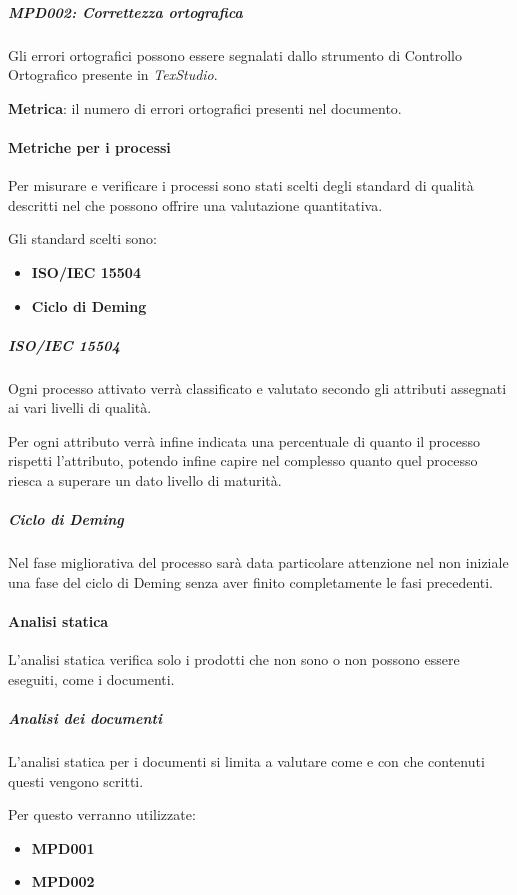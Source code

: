 				\subparagraph{MPD002: Correttezza ortografica}
				Gli errori ortografici possono essere segnalati dallo strumento di Controllo Ortografico presente in \textit{TexStudio}.
				
				\textbf{Metrica}: il numero di errori ortografici presenti nel documento.
	
			\paragraph{Metriche per i processi}
				Per misurare e verificare i processi sono stati scelti degli standard di qualità descritti nel \Doc{\PdQ} che possono offrire una valutazione quantitativa.
				
				Gli standard scelti sono:
				
				\begin{itemize}
					\item \textbf{ISO/IEC 15504}
					\item \textbf{Ciclo di Deming}
				\end{itemize}
			
				\subparagraph*{ISO/IEC 15504}
				Ogni processo attivato verrà classificato e valutato secondo gli attributi assegnati ai vari livelli di qualità.
				
				Per ogni attributo verrà infine indicata una percentuale di quanto il processo rispetti l'attributo, potendo infine capire nel complesso quanto quel processo riesca a superare un dato livello di maturità.
				
				\subparagraph*{Ciclo di Deming}
				Nel fase migliorativa del processo sarà data particolare attenzione nel non iniziale una fase del ciclo di Deming senza aver finito completamente le fasi precedenti.
	
			\paragraph{Analisi statica}
				L'analisi statica verifica solo i prodotti che non sono o non possono essere eseguiti, come i documenti.
				
				\subparagraph*{Analisi dei documenti}
				L'analisi statica per i documenti si limita a valutare come e con che contenuti questi vengono scritti.
				
				Per questo verranno utilizzate:
				
				\begin{itemize}
					\item \textbf{MPD001}
					\item \textbf{MPD002}
				\end{itemize}
			
